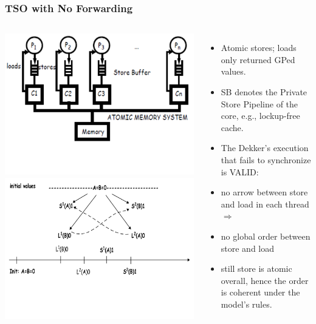 \documentclass{beamer}
\begin{document}
\begin{frame}[fragile,t]
\frametitle{TSO with No Forwarding}


\begin{columns}
\includegraphics[width=39ex]{Ch7Figs/NoFwdingStoreBuf}\\\vspace{-5ex}
\includegraphics[width=39ex]{Ch7Figs/NoFwdingStoreBufGraph}\pause
{}
\vspace{-9ex}
\begin{itemize}
    \item Atomic stores; loads only returned GPed values.
    \item \alert{SB denotes the Private Store Pipeline} of the core, e.g., lockup-free cache.
    \item The Dekker's execution that fails to synchronize is VALID:
    \item no arrow between store and load in each thread $\Rightarrow$
    \item no global order between store and load
    \item still store is atomic overall, hence the order is coherent under the model's rules.
\end{itemize}
\end{columns}
\end{frame}
\end{document}
